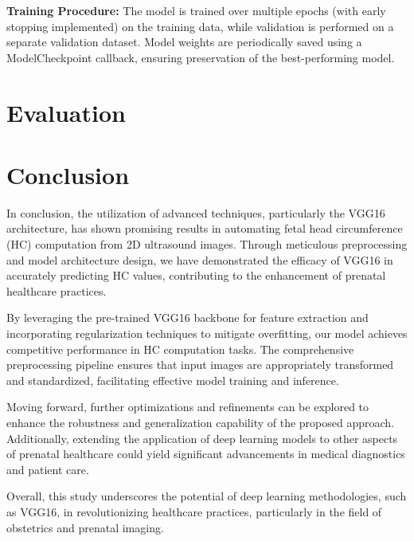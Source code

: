 \documentclass[conference]{IEEEtran}
\begin{document}
\textbf{Training Procedure:} The model is trained over multiple epochs (with early stopping implemented) on the training data, while validation is performed on a separate validation dataset.
Model weights are periodically saved using a ModelCheckpoint callback, ensuring preservation of the best-performing model.

\section{\textbf{Evaluation}}


\section{\textbf{Conclusion}}

In conclusion, the utilization of advanced techniques, particularly the VGG16 architecture, has shown promising results in automating fetal head circumference (HC) computation from 2D ultrasound images. Through meticulous preprocessing and model architecture design, we have demonstrated the efficacy of VGG16 in accurately predicting HC values, contributing to the enhancement of prenatal healthcare practices.

By leveraging the pre-trained VGG16 backbone for feature extraction and incorporating regularization techniques to mitigate overfitting, our model achieves competitive performance in HC computation tasks. The comprehensive preprocessing pipeline ensures that input images are appropriately transformed and standardized, facilitating effective model training and inference.

Moving forward, further optimizations and refinements can be explored to enhance the robustness and generalization capability of the proposed approach. Additionally, extending the application of deep learning models to other aspects of prenatal healthcare could yield significant advancements in medical diagnostics and patient care.

Overall, this study underscores the potential of deep learning methodologies, such as VGG16, in revolutionizing healthcare practices, particularly in the field of obstetrics and prenatal imaging.
\end{document}
